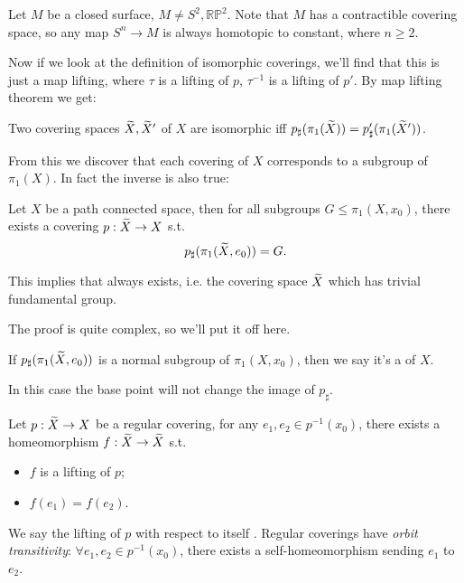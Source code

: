 \begin{example}
    Let $M$ be a closed surface, $M \ne S^2, \mathbb{RP}^2$.
	Note that $M$ has a contractible covering space,
	so any map $S^n \to M$ is always homotopic to constant, where $n\ge 2$.
\end{example}

Now if we look at the definition of isomorphic coverings,
we'll find that this is just a map lifting, where $\tau$ is a lifting
of $p$, $\tau^{-1}$ is a lifting of $p'$.
By map lifting theorem we get:
\begin{corollary}
    Two covering spaces $\widetilde{X}, \widetilde{X}'$ of $X$ are isomorphic
	iff $p_\sharp(\pi_1(\widetilde{X})) = p'_\sharp(\pi_1(\widetilde{X}'))$.
\end{corollary}

From this we discover that each covering of $X$ corresponds
to a subgroup of $\pi_1(X)$. In fact the inverse is also true:
\begin{theorem}
    Let $X$ be a path connected space,
	then for all subgroups $G \leqslant \pi_1(X, x_0)$,
	there exists a covering $p: \widetilde{X} \to X$ s.t.
	\[
	p_\sharp(\pi_1(\widetilde{X}, e_0)) = G.
	\]
\end{theorem}
\begin{remark}
    This implies that  always exists,
	i.e. the covering space $\widetilde{X}$ which has trivial fundamental group.
\end{remark}

The proof is quite complex, so we'll put it off here.

\begin{definition}
	If $p_\sharp(\pi_1(\widetilde{X}, e_0))$ is a normal subgroup of $\pi_1(X, x_0)$,
	then we say it's a  of $X$.
\end{definition}
In this case the base point will not change the image of $p_\sharp$.

\begin{proposition}
	Let $p:\widetilde{X} \to X$ be a regular covering, for any $ e_1, e_2\in p^{-1}(x_0)$,
	there exists a homeomorphism $f: \widetilde{X} \to \widetilde{X}$ s.t.
	\begin{itemize}
		\item $f$ is a lifting of $p$;
		\item  $f(e_1) = f(e_2)$.
	\end{itemize}
\end{proposition}

We say the lifting of $p$ with respect to itself .
Regular coverings have \textit{orbit transitivity}:
$\forall e_1, e_2\in p^{-1}(x_0)$, there exists a self-homeomorphism
sending $e_1$ to $e_2$.
